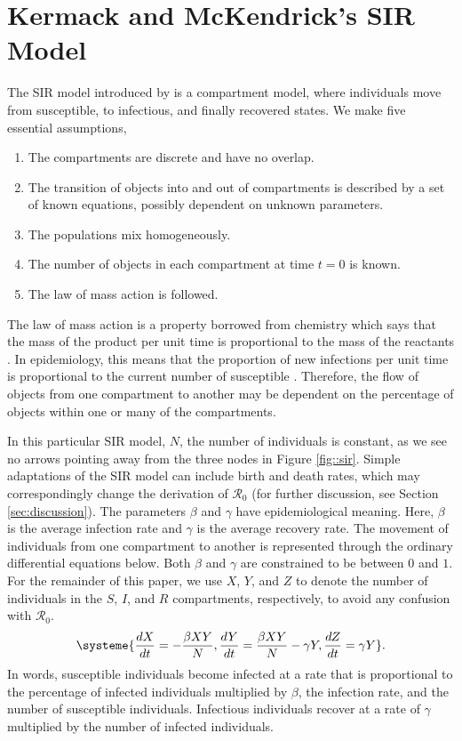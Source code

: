 \message{ !name(draft_v13.tex)}\documentclass[12pt]{article}
\newcommand{\rr}{\ensuremath{\mathcal{R}_0}}
\begin{document}
\section{Kermack and McKendrick's SIR Model}
\label{sec:sir-intro}

The SIR model introduced by \cite{Kermack700} is a compartment model, where individuals move from susceptible, to infectious, and finally recovered states.  We make five essential assumptions,
\begin{enumerate}
\item The compartments are discrete and have no overlap.
\item The transition of objects into and out of compartments is described by a set of known equations, possibly dependent on unknown parameters.
\item The populations mix homogeneously.
\item The number of objects in each compartment at time $t=0$ is known.
  \item The law of mass action is followed.
  \end{enumerate}  


The law of mass action is a property borrowed from chemistry which says that the mass of the product per unit time is proportional to the mass of the reactants \citep{lotka1920}.  In epidemiology, this means that the proportion of new infections per unit time is proportional to the current  number of susceptible \citep{anderson1992}.  Therefore, the flow of objects from one compartment to another may be dependent on the percentage of objects within one or many of the compartments. 


In this particular  SIR model, $N$, the number of individuals is constant, as we see no arrows pointing away from the three nodes in Figure \ref{fig::sir}. Simple adaptations of the SIR model can include birth and death rates, which may correspondingly change the derivation of $\rr$ (for further discussion, see Section \ref{sec:discussion}). The parameters  $\beta$ and $\gamma$ have epidemiological meaning.  Here, $\beta$ is the average infection rate and $\gamma$ is the average recovery rate.  The movement of individuals from one compartment to another is represented through the ordinary differential equations below.  Both $\beta$ and $\gamma$ are constrained to be between $0$ and $1$.  For the remainder of this paper, we use $X$, $Y$, and $Z$ to denote the number of individuals in the $S$, $I$, and $R$ compartments, respectively, to avoid any confusion with $\rr$.
\begin{align}
\systeme{\frac{dX}{dt} = -\frac{\beta XY}{N}, \frac{dY}{dt} = \frac{\beta XY}{N} - \gamma Y, \frac{dZ}{dt} = \gamma Y}. \label{eq:sir}
\end{align}
In words, susceptible individuals become infected at a rate that is proportional to the percentage of infected individuals multiplied by $\beta$, the infection rate, and the number of susceptible individuals.  Infectious individuals recover at a rate of $\gamma$ multiplied by the number of infected individuals.
\end{document}
